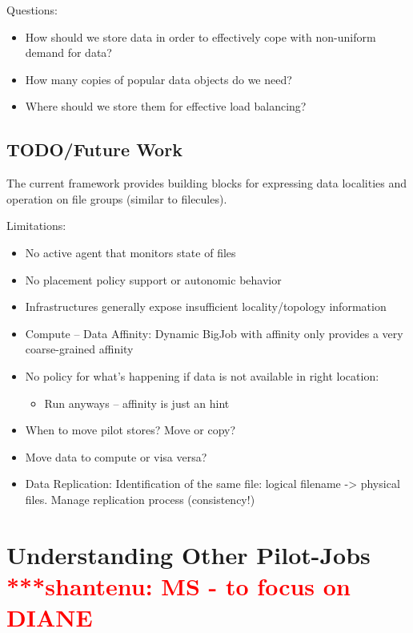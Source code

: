 \documentclass[conference,final]{IEEEtran}
\newcommand{\jhanote}[1]{ {\textcolor{red} { ***shantenu: #1 }}}
\newcommand{\jhanote}[1]{}
\begin{document}
Questions:
\begin{itemize}
    \item How should
    we store data in order to effectively cope with non-uniform demand for
    data? 
    \item How many copies of popular data objects do we need? 
    \item Where should we store them for effective load balancing?
\end{itemize}

\subsection{TODO/Future Work}
The current framework provides building blocks for expressing data localities and operation on file groups (similar to filecules).

Limitations:
\begin{itemize}
    \item No active agent that monitors state of files
    \item No placement policy support or autonomic behavior
    \item Infrastructures generally expose insufficient locality/topology information
    \item Compute – Data Affinity: Dynamic BigJob with affinity only provides a very coarse-grained affinity
    \item No policy for what’s happening if data is not available in right location:
    \begin{itemize}
        \item Run anyways – affinity is just an hint
    \end{itemize}
    \item When to move pilot stores? Move or copy?
    \item Move data to compute or visa versa?
    \item Data Replication: Identification of the same file: logical filename -> physical files. Manage replication process (consistency!)
\end{itemize}




\section{Understanding Other Pilot-Jobs \jhanote{MS - to focus on
    DIANE}}
\end{document}
